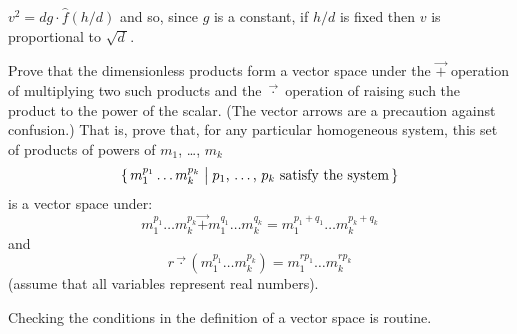\begin{exercises}
\begin{answer}
\begin{exparts}
              $v^2=dg\cdot\hat{f}(h/d)$ and so, since $g$ is a constant,
              if $h/d$ is fixed then $v$ is proportional to $\sqrt{d\,}$.
          \end{exparts}
        \end{answer}
   \item \label{exer:DimLessProdsVecSp}
      Prove that the dimensionless products form a vector space
      under the $\vec{+}$ operation of multiplying two such products 
      and the $\vec{\cdot}$ operation of raising 
      such the product to the power of the scalar.
      (The vector arrows are a precaution against confusion.)
      That is, prove that, for any particular homogeneous system,
      this set of products of powers of $m_1$, \ldots, $m_k$
      \begin{equation*}
        \mbox{$\{\,m_1^{p_1}\dots m_k^{p_k}
             \bigm| 
              \text{$p_1$, \ldots, $p_k$ satisfy the system}\,\}$}
      \end{equation*}
      is a vector space under:
      \begin{equation*}
        m_1^{p_1}\dots m_k^{p_k}
        \vec{+}
        m_1^{q_1}\dots m_k^{q_k}
        =
        m_1^{p_1+q_1}\dots m_k^{p_k+q_k}
      \end{equation*}
      and
      \begin{equation*}
        r\vec{\cdot} (m_1^{p_1}\dots m_k^{p_k})
        =
        m_1^{rp_1}\dots m_k^{rp_k}
      \end{equation*}
      (assume that all variables represent real numbers).
      \begin{answer}
        Checking the conditions in the definition of a vector space is 
        routine.
      \end{answer}
  \item \label{exer:AppsAndOranges}

\end{exercises}
